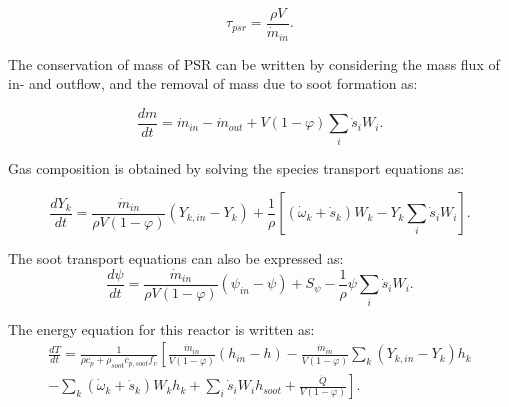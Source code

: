 \begin{equation}
	\tau_{psr} = \frac{\rho V}{\dot{m}_{in}}
	\label{eqn:taupsr}.
\end{equation} 

The conservation of mass of PSR can be written by considering the mass flux of in- and outflow, and the removal of mass due to soot formation as:

\begin{equation}
	\frac{d m}{d t}
	=
	\dot{m}_{in} - \dot{m}_{out} 
	+ V(1 - \varphi)\sum_i \dot{s}_i W_i 
	\label{eqn:contpsr}.
\end{equation}

Gas composition is obtained by solving the species transport equations as:

\begin{equation}
	\frac{d Y_k}{d t}
	=
	\frac{{\dot{m}}_{in}}{\rho V
	\left(1-\varphi\right)}
	\left(Y_{k,in}-Y_k \right)+
	\frac{1}{\rho}\left[\left(\dot{\omega}_k+\dot{s}_k\right) W_k-Y_k \sum_i \dot{s}_i W_i\right]
	\label{eqn:speciespsr}.
\end{equation}

The soot transport equations can also be expressed as:
\begin{equation}
	\frac{d\psi}{dt}
	=
	\frac{{\dot{m}}_{in}}{\rho V
		\left(1-\varphi\right)}
	\left(\psi_{in}-\psi\right)
	+
	S_{\psi}
	-\frac{1}{\rho}\psi\sum_{i}{{\dot{s}}_i W_i}
	\label{eqn:sootpsr}.
\end{equation}

The energy equation for this reactor is written as:
\begin{equation}
	\begin{split}
		\frac{dT}{dt}
		=
		\frac{1}
		{
			\rho c_p+\rho_{soot}c_{p,soot}f_v
		}
		\left[
		\frac{{\dot{m}}_{in}}{V(1 - \varphi)}
		\left(h_{in}-h\right)
		-
		\frac{{\dot{m}}_{in}}{V (1 - \varphi)}\sum_{k}\left(Y_{k,in}-Y_k\right)h_k
		\right.\\
		\left.	
		-
		\sum_{k}{
			\left(
			{\dot{\omega}}_k
			+
			{\dot{s}}_k
			\right) W_k h_k}
		+\sum_{i}{{\dot{s}}_i W_i} h_{soot}+\frac{\dot{Q}}{V(1 - \varphi)}
		\right].
	\end{split}
		\label{eqn:energypsr}
\end{equation}



